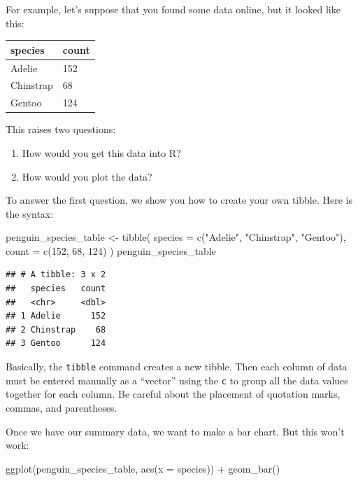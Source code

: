 \documentclass[
]{book}
\newenvironment{Shaded}{\begin{snugshade}}{\end{snugshade}}
\newcommand{\AttributeTok}[1]{\textcolor[rgb]{0.77,0.63,0.00}{#1}}
\newcommand{\DecValTok}[1]{\textcolor[rgb]{0.00,0.00,0.81}{#1}}
\newcommand{\FunctionTok}[1]{\textcolor[rgb]{0.00,0.00,0.00}{#1}}
\newcommand{\NormalTok}[1]{#1}
\newcommand{\OtherTok}[1]{\textcolor[rgb]{0.56,0.35,0.01}{#1}}
\newcommand{\SpecialCharTok}[1]{\textcolor[rgb]{0.00,0.00,0.00}{#1}}
\newcommand{\StringTok}[1]{\textcolor[rgb]{0.31,0.60,0.02}{#1}}
\providecommand{\tightlist}{%
  \setlength{\itemsep}{0pt}\setlength{\parskip}{0pt}}
\begin{document}
For example, let's suppose that you found some data online, but it looked like this:

\begin{longtable}[]{@{}ll@{}}
\toprule()
species & count \\
\midrule()
\endhead
Adelie & 152 \\
Chinstrap & 68 \\
Gentoo & 124 \\
\bottomrule()
\end{longtable}

This raises two questions:

\begin{enumerate}
\def\labelenumi{\arabic{enumi}.}
\tightlist
\item
  How would you get this data into R?
\item
  How would you plot the data?
\end{enumerate}

To answer the first question, we show you how to create your own tibble. Here is the syntax:

\begin{Shaded}
\begin{Highlighting}[]
\NormalTok{penguin\_species\_table }\OtherTok{\textless{}{-}} \FunctionTok{tibble}\NormalTok{(}
    \AttributeTok{species =} \FunctionTok{c}\NormalTok{(}\StringTok{"Adelie"}\NormalTok{, }\StringTok{"Chinstrap"}\NormalTok{, }\StringTok{"Gentoo"}\NormalTok{),}
    \AttributeTok{count =} \FunctionTok{c}\NormalTok{(}\DecValTok{152}\NormalTok{, }\DecValTok{68}\NormalTok{, }\DecValTok{124}\NormalTok{)}
\NormalTok{)}
\NormalTok{penguin\_species\_table}
\end{Highlighting}
\end{Shaded}

\begin{verbatim}
## # A tibble: 3 x 2
##   species   count
##   <chr>     <dbl>
## 1 Adelie      152
## 2 Chinstrap    68
## 3 Gentoo      124
\end{verbatim}

Basically, the \texttt{tibble} command creates a new tibble. Then each column of data must be entered manually as a ``vector'' using the \texttt{c} to group all the data values together for each column. Be careful about the placement of quotation marks, commas, and parentheses.

Once we have our summary data, we want to make a bar chart. But this won't work:

\begin{Shaded}
\begin{Highlighting}[]
\FunctionTok{ggplot}\NormalTok{(penguin\_species\_table, }\FunctionTok{aes}\NormalTok{(}\AttributeTok{x =}\NormalTok{ species)) }\SpecialCharTok{+}
    \FunctionTok{geom\_bar}\NormalTok{()}
\end{Highlighting}
\end{Shaded}
\end{document}
